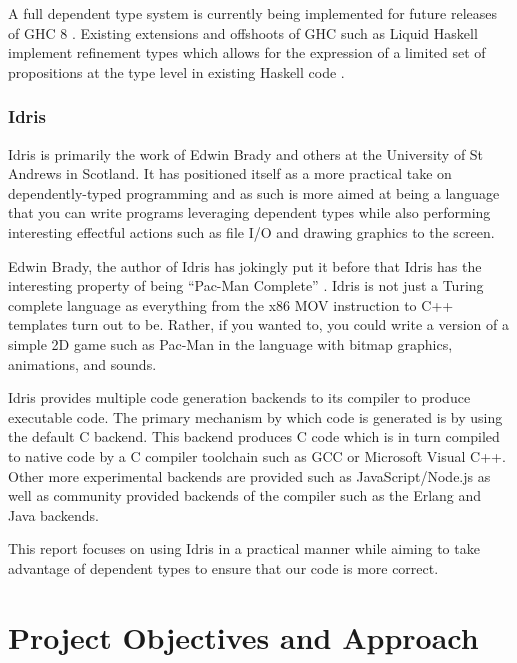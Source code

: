 \documentclass[a4paper, notitlepage]{report}
\begin{document}
A full dependent type system is currently being implemented for future releases
of GHC 8 \cite{eisenberg_dependent_2016,weirich_specif_2017}. Existing
extensions and offshoots of GHC such as Liquid Haskell implement refinement
types which allows for the expression of a limited set of propositions at the
type level in existing Haskell code \cite{vazou_refinement_2014}.

\subsection{Idris}
\label{sec:org7c992bf}
Idris is primarily the work of Edwin Brady and others at the University of St
Andrews in Scotland. It has positioned itself as a more practical take on
dependently-typed programming and as such is more aimed at being a language that
you can write programs leveraging dependent types while also performing
interesting effectful actions such as file I/O and drawing graphics to the
screen.

Edwin Brady, the author of Idris has jokingly put it before that Idris has the
interesting property of being ``Pac-Man Complete'' \cite{scala_world_2015}. Idris
is not just a Turing complete language as everything from the x86 MOV
instruction \cite{dolan_mov_2013} to C++ templates \cite{veldhuizen_templates_2003}
turn out to be. Rather, if you wanted to, you could write a version of a simple
2D game such as Pac-Man in the language with bitmap graphics, animations, and
sounds.

Idris provides multiple code generation backends to its compiler to produce
executable code. The primary mechanism by which code is generated is by using
the default C backend. This backend produces C code which is in turn compiled to
native code by a C compiler toolchain such as GCC or Microsoft Visual C++. Other
more experimental backends are provided such as JavaScript/Node.js as well as
community provided backends of the compiler such as the Erlang
\cite{elliott_erlang_2015} and Java \cite{idris_java} backends.

This report focuses on using Idris in a practical manner while aiming to take
advantage of dependent types to ensure that our code is more correct.
\chapter{Project Objectives and Approach}
\label{sec:org2bc20e1}
\end{document}
